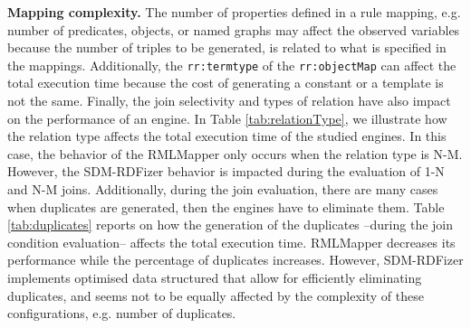 \noindent \textbf{Mapping complexity.} The number of properties defined in a rule mapping, e.g. number of predicates, objects, or named graphs may affect the observed variables because the number of triples to be generated, is related to what is specified in the mappings. Additionally, the \texttt{rr:termtype} of the \texttt{rr:objectMap} can affect the total execution time because the cost of generating a constant or a template is not the same. Finally, the join selectivity and types of relation have also impact on the performance of an engine. In Table \ref{tab:relationType}, we illustrate how the relation type affects the total execution time of the studied engines. In this case, the behavior of the RMLMapper only occurs when the relation type is N-M. However, the SDM-RDFizer behavior is impacted during the evaluation of 1-N and N-M joins. Additionally, during the join evaluation, there are many cases when duplicates are generated, then the engines have to eliminate them. Table \ref{tab:duplicates} reports on how the generation of the duplicates --during the join condition evaluation-- affects the total execution time. RMLMapper decreases its performance while the percentage of duplicates increases. However,  SDM-RDFizer implements optimised data structured that allow for efficiently eliminating duplicates, and seems not to be equally affected by the complexity of these configurations, e.g. number of duplicates. 

